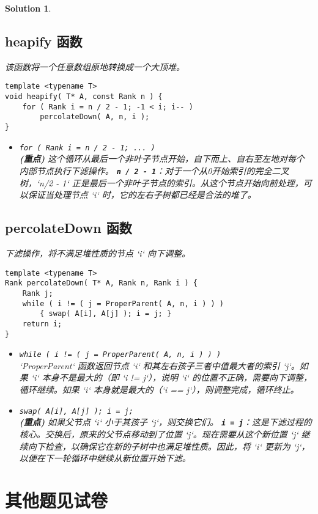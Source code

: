 \documentclass[UTF8]{report}
\newtheorem{solution}{Solution}
\theoremstyle{MyLineTheoremStyle} %
\theoremstyle{MyBlockTheoremStyle} %
\theoremstyle{MySubsubsectionStyle} %
\begin{document}
\begin{enumerate}
\begin{solution}
    \subsection*{heapify 函数}
    该函数将一个任意数组原地转换成一个大顶堆。
    \begin{lstlisting}[style=cppstyle]
template <typename T> 
void heapify( T* A, const Rank n ) {
    for ( Rank i = n / 2 - 1; -1 < i; i-- )
        percolateDown( A, n, i );
}
    \end{lstlisting}
    \begin{itemize}
        \item \texttt{for ( Rank i = n / 2 - 1; ... )} \\
        \textbf{(重点)} 这个循环从最后一个非叶子节点开始，自下而上、自右至左地对每个内部节点执行下滤操作。
        \textbf{\texttt{n / 2 - 1}}：对于一个从0开始索引的完全二叉树，`n/2 - 1` 正是最后一个非叶子节点的索引。从这个节点开始向前处理，可以保证当处理节点 `i` 时，它的左右子树都已经是合法的堆了。
    \end{itemize}

    \subsection*{percolateDown 函数}
    下滤操作，将不满足堆性质的节点 `i` 向下调整。
    \begin{lstlisting}[style=cppstyle]
template <typename T> 
Rank percolateDown( T* A, Rank n, Rank i ) {
    Rank j;
    while ( i != ( j = ProperParent( A, n, i ) ) )
        { swap( A[i], A[j] ); i = j; }
    return i;
}
    \end{lstlisting}
    \begin{itemize}
        \item \texttt{while ( i != ( j = ProperParent( A, n, i ) ) )} \\
        `ProperParent` 函数返回节点 `i` 和其左右孩子三者中值最大者的索引 `j`。如果 `i` 本身不是最大的（即 `i != j`），说明 `i` 的位置不正确，需要向下调整，循环继续。如果 `i` 本身就是最大的（`i == j`），则调整完成，循环终止。
        
        \item \texttt{swap( A[i], A[j] ); i = j;} \\
        \textbf{(重点)} 如果父节点 `i` 小于其孩子 `j`，则交换它们。
        \textbf{\texttt{i = j}}：这是下滤过程的核心。交换后，原来的父节点移动到了位置 `j`。现在需要从这个新位置 `j` 继续向下检查，以确保它在新的子树中也满足堆性质。因此，将 `i` 更新为 `j`，以便在下一轮循环中继续从新位置开始下滤。
    \end{itemize}
    \end{solution}



\end{enumerate}


\section*{其他题见试卷}
\end{document}
